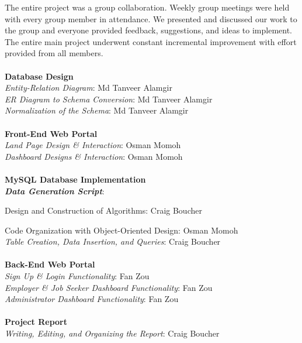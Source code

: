\documentclass[11pt]{article}
\begin{document}
The entire project was a group collaboration. Weekly group meetings were held with every group member in attendance. We presented and discussed our work to the group and everyone provided feedback, suggestions, and ideas to implement. The entire main project underwent constant incremental improvement with effort provided from all members. \\
\\
\textbf{Database Design} \\
\textit{Entity-Relation Diagram}: Md Tanveer Alamgir \\
\textit{ER Diagram to Schema Conversion}: Md Tanveer Alamgir \\
\textit{Normalization of the Schema}: Md Tanveer Alamgir \\
\\
\textbf{Front-End Web Portal} \\
\textit{Land Page Design \& Interaction}: Osman Momoh \\
\textit{Dashboard Designs \& Interaction}: Osman Momoh \\
\\
\textbf{MySQL Database Implementation}\\
\textbf{\textit{Data Generation Script}}: \par
Design and Construction of Algorithms: Craig Boucher \par
Code Organization with Object-Oriented Design: Osman Momoh \\
\textit{Table Creation, Data Insertion, and Queries}: Craig Boucher \\
\\
\textbf{Back-End Web Portal} \\
\textit{Sign Up \& Login Functionality}: Fan Zou \\
\textit{Employer \& Job Seeker Dashboard Functionality}: Fan Zou \\
\textit{Administrator Dashboard Functionality}: Fan Zou \\
\\
\textbf{Project Report} \\
\textit{Writing, Editing, and Organizing the Report}: Craig Boucher
\end{document}
